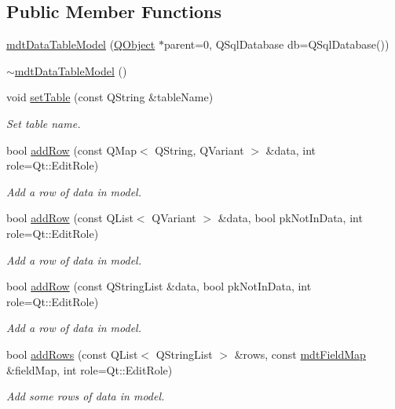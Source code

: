 \subsection*{Public Member Functions}
\begin{DoxyCompactItemize}
\item 
\hyperlink{classmdt_data_table_model_abb59a97c41fea89a44c7b728774ef2ee}{mdt\-Data\-Table\-Model} (\hyperlink{class_q_object}{Q\-Object} $\ast$parent=0, Q\-Sql\-Database db=Q\-Sql\-Database())
\item 
\hyperlink{classmdt_data_table_model_a1d4acd3ab7e8f7759f09c4fb687321b1}{$\sim$mdt\-Data\-Table\-Model} ()
\item 
void \hyperlink{classmdt_data_table_model_a75d4204a5d388756605422110d3afca1}{set\-Table} (const Q\-String \&table\-Name)
\begin{DoxyCompactList}\small\item\em Set table name. \end{DoxyCompactList}\item 
bool \hyperlink{classmdt_data_table_model_a42046e42fdca91fe77fe48e70fed4d18}{add\-Row} (const Q\-Map$<$ Q\-String, Q\-Variant $>$ \&data, int role=Qt\-::\-Edit\-Role)
\begin{DoxyCompactList}\small\item\em Add a row of data in model. \end{DoxyCompactList}\item 
bool \hyperlink{classmdt_data_table_model_a9c83ac307174ed88eb2204b336d38ee2}{add\-Row} (const Q\-List$<$ Q\-Variant $>$ \&data, bool pk\-Not\-In\-Data, int role=Qt\-::\-Edit\-Role)
\begin{DoxyCompactList}\small\item\em Add a row of data in model. \end{DoxyCompactList}\item 
bool \hyperlink{classmdt_data_table_model_a2834bc9663aa478bac5147d2ca7e16ee}{add\-Row} (const Q\-String\-List \&data, bool pk\-Not\-In\-Data, int role=Qt\-::\-Edit\-Role)
\begin{DoxyCompactList}\small\item\em Add a row of data in model. \end{DoxyCompactList}\item 
bool \hyperlink{classmdt_data_table_model_a359a37d1719c0f56110875888466e331}{add\-Rows} (const Q\-List$<$ Q\-String\-List $>$ \&rows, const \hyperlink{classmdt_field_map}{mdt\-Field\-Map} \&field\-Map, int role=Qt\-::\-Edit\-Role)
\begin{DoxyCompactList}\small\item\em Add some rows of data in model. \end{DoxyCompactList}\item 

\end{DoxyCompactItemize}
